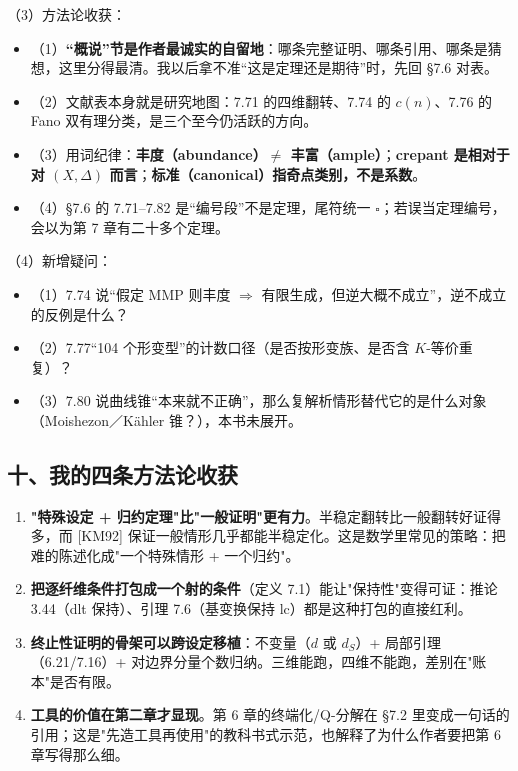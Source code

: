 （3）方法论收获：
\begin{itemize}
\item （1）\textbf{“概说”节是作者最诚实的自留地}：哪条完整证明、哪条引用、哪条是猜想，这里分得最清。我以后拿不准“这是定理还是期待”时，先回 \S7.6 对表。
\item （2）文献表本身就是研究地图：7.71 的四维翻转、7.74 的 $c(n)$、7.76 的 Fano 双有理分类，是三个至今仍活跃的方向。
\item （3）用词纪律：\textbf{丰度（abundance）$\ne$ 丰富（ample）}；\textbf{crepant 是相对于对 $(X,\Delta)$ 而言}；\textbf{标准（canonical）指奇点类别，不是系数}。
\item （4）\S7.6 的 7.71--7.82 是“编号段”不是定理，尾符统一 $\square$；若误当定理编号，会以为第 7 章有二十多个定理。
\end{itemize}

（4）新增疑问：
\begin{itemize}
\item （1）7.74 说“假定 MMP 则丰度 $\Rightarrow$ 有限生成，但逆大概不成立”，逆不成立的反例是什么？
\item （2）7.77“104 个形变型”的计数口径（是否按形变族、是否含 $K$-等价重复）？
\item （3）7.80 说曲线锥“本来就不正确”，那么复解析情形替代它的是什么对象（Moishezon／Kähler 锥？），本书未展开。
\end{itemize}

\subsection*{十、我的四条方法论收获}

\begin{enumerate}
\item \textbf{"特殊设定 + 归约定理"比"一般证明"更有力}。半稳定翻转比一般翻转好证得多，而 [KM92] 保证一般情形几乎都能半稳定化。这是数学里常见的策略：把难的陈述化成"一个特殊情形 + 一个归约"。
\item \textbf{把逐纤维条件打包成一个射的条件}（定义 7.1）能让"保持性"变得可证：推论 3.44（dlt 保持）、引理 7.6（基变换保持 lc）都是这种打包的直接红利。
\item \textbf{终止性证明的骨架可以跨设定移植}：不变量（$d$ 或 $d_S$）+ 局部引理（6.21/7.16）+ 对边界分量个数归纳。三维能跑，四维不能跑，差别在"账本"是否有限。
\item \textbf{工具的价值在第二章才显现}。第 6 章的终端化/Q-分解在 \S7.2 里变成一句话的引用；这是"先造工具再使用"的教科书式示范，也解释了为什么作者要把第 6 章写得那么细。
\end{enumerate}

